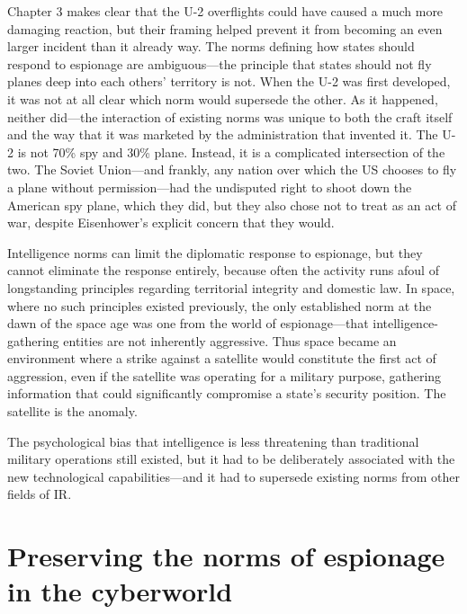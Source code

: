 \documentclass{report}
\begin{document}
Chapter 3 makes clear that the U-2 overflights could have caused a much more damaging reaction, but their framing helped prevent it from becoming an even larger incident than it already way. The norms defining how states should respond to espionage are ambiguous---the principle that states should not fly planes deep into each others' territory is not. When the U-2 was first developed, it was not at all clear which norm would supersede the other. As it happened, neither did---the interaction of existing norms was unique to both the craft itself and the way that it was marketed by the administration that invented it. The U-2 is not 70\% spy and 30\% plane. Instead, it is a complicated intersection of the two. The Soviet Union---and frankly, any nation over which the US chooses to fly a plane without permission---had the undisputed right to shoot down the American spy plane, which they did, but they also chose not to treat as an act of war, despite Eisenhower's explicit concern that they would.

Intelligence norms can limit the diplomatic response to espionage, but they cannot eliminate the response entirely, because often the activity runs afoul of longstanding principles regarding territorial integrity and domestic law. In space, where no such principles existed previously, the only established norm at the dawn of the space age was one from the world of espionage---that intelligence-gathering entities are not inherently aggressive. Thus space became an environment where a strike against a satellite would constitute the first act of aggression, even if the satellite was operating for a military purpose, gathering information that could significantly compromise a state's security position. The satellite is the anomaly.


The psychological bias that intelligence is less threatening than traditional military operations still existed, but it had to be deliberately associated with the new technological capabilities---and it had to supersede existing norms from other fields of IR.



\section{Preserving the norms of espionage in the cyberworld}
\end{document}
